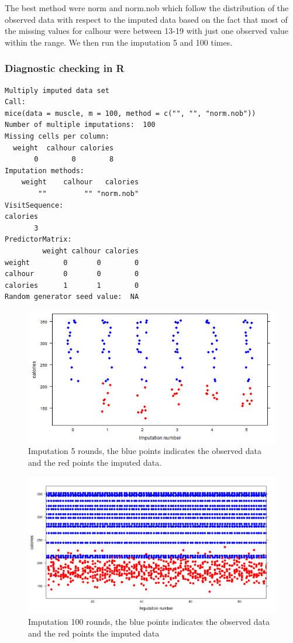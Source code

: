 \documentclass[11pt, a4paper]{article}
\begin{document}
The best method were norm and norm.nob which follow the distribution
of the observed data with respect to the imputed data based on the
fact that most of the missing values for calhour were between 13-19
with just one observed value within the range. We then run the
imputation 5 and 100 times.

\subsubsection{Diagnostic checking in R}
\begin{verbatim}
Multiply imputed data set
Call:
mice(data = muscle, m = 100, method = c("", "", "norm.nob"))
Number of multiple imputations:  100
Missing cells per column:
  weight  calhour calories 
       0        0        8 
Imputation methods:
    weight    calhour   calories 
        ""         "" "norm.nob" 
VisitSequence:
calories 
       3 
PredictorMatrix:
         weight calhour calories
weight        0       0        0
calhour       0       0        0
calories      1       1        0
Random generator seed value:  NA 
\end{verbatim}


\begin{figure}[H]
    \centering
    \includegraphics[scale=.5]{impu5.png}
    \caption{Imputation 5 rounds, the blue points indicates the
      observed data and the red points the imputed data.}
    \label{fig:imputation5}
\end{figure}


\begin{figure}[H]
    \centering
    \includegraphics[scale=.5]{imputation100.png}
    \caption{Imputation 100 rounds, the blue points indicates the
      observed data and the red points the imputed data}
    \label{fig:imputation100}
\end{figure}
\end{document}
